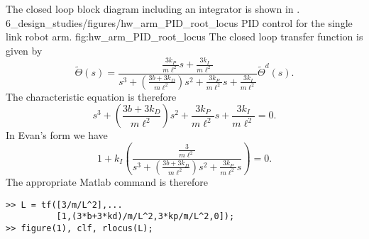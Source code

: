 
The closed loop block diagram including an integrator is shown in .
	{6_design_studies/figures/hw_arm_PID_root_locus}
	{PID control for the single link robot arm.}
	{fig:hw_arm_PID_root_locus}
The closed loop transfer function is given by
\[
\tilde{\Theta}(s) = \frac{\frac{3k_P}{m\ell^2}s + \frac{3k_I}{m\ell^2}}{s^3 + \left(\frac{3b+3k_D}{m\ell^2}\right)s^2 + \frac{3k_P}{m\ell^2}s + \frac{3k_I}{m\ell^2}} \tilde{\Theta}^d(s).
\]
The characteristic equation is therefore
\[
s^3 + \left(\frac{3b+3k_D}{m\ell^2}\right)s^2 + \frac{3k_P}{m\ell^2}s + \frac{3k_I}{m\ell^2} = 0.
\]
In Evan's form we have
\[
1 + k_I\left(\frac{\frac{3}{m\ell^2}}{s^3 + \left(\frac{3b+3k_D}{m\ell^2}\right)s^2 + \frac{3k_P}{m\ell^2}s}\right) = 0.
\]
The appropriate Matlab command is therefore
\begin{lstlisting}
>> L = tf([3/m/L^2],...
          [1,(3*b+3*kd)/m/L^2,3*kp/m/L^2,0]);
>> figure(1), clf, rlocus(L);
\end{lstlisting}
